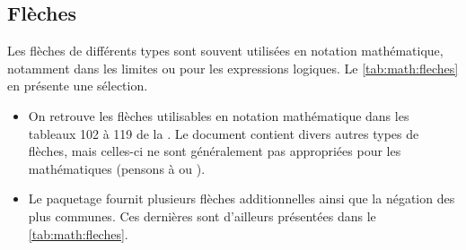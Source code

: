 \subsection{Flèches}
\label{sec:math:symboles:fleches}

Les flèches de différents types sont souvent utilisées en notation
mathématique, notamment dans les limites ou pour les expressions
logiques. Le \autoref{tab:math:fleches} en présente une sélection.

\begin{itemize}
\item On retrouve les flèches utilisables en notation mathématique
  dans les tableaux 102 à 119 de la %
  . %
  Le document contient divers autres types de flèches, mais celles-ci
  ne sont généralement pas appropriées pour les mathématiques (pensons
  à {\manerrarrow} ou {\faArrowRight}).
\item Le paquetage  fournit plusieurs flèches
  additionnelles ainsi que la négation des plus communes. Ces
  dernières sont d'ailleurs présentées dans le
  \autoref{tab:math:fleches}.
\end{itemize}

